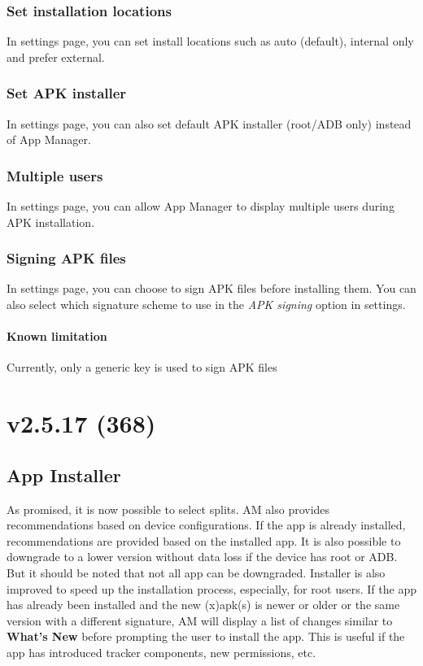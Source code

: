 \subsubsection{Set installation locations}
In settings page, you can set install locations such as auto (default), internal only and prefer external.

\subsubsection{Set APK installer}
In settings page, you can also set default APK installer (root/ADB only) instead of App Manager.

\subsubsection{Multiple users}
In settings page, you can allow App Manager to display multiple users during APK installation.

\subsubsection{Signing APK files}
In settings page, you can choose to sign APK files before installing them. You can also select which signature scheme
to use in the \textit{APK signing} option in settings.

\paragraph{Known limitation} Currently, only a generic key is used to sign APK files


\section{v2.5.17 (368)}

\subsection{App Installer}
As promised, it is now possible to select splits. AM also provides recommendations based on device configurations.
If the app is already installed, recommendations are provided based on the installed app. It is also possible to
downgrade to a lower version without data loss if the device has root or ADB. But it should be noted that not all app
can be downgraded. Installer is also improved to speed up the installation process, especially, for root users.
If the app has already been installed and the new (x)apk(s) is newer or older or the same version with a different
signature, AM will display a list of changes similar to \textbf{What's New} before prompting the user to install
the app. This is useful if the app has introduced tracker components, new permissions, etc.

